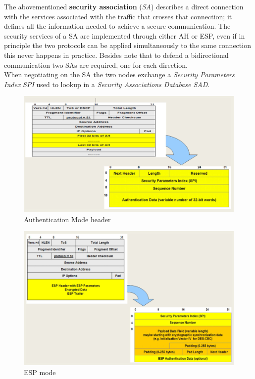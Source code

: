 The abovementioned \textbf{security association} (\textit{SA}) describes a direct connection with the
services associated with the traffic that crosses that connection;
it defines all the information needed to achieve a secure
communication.
The security services of a SA are implemented through either AH
or ESP, even if in principle the two protocols can be applied
simultaneously to the same connection this never happens in
practice.
Besides note that to defend a bidirectional communication two SAs are required,
one for each direction.\\
When negotiating on the SA the two nodes exchange a \textit{Security Parameters Index} \textit{SPI} used to lookup in a \textit{Security Associations Database SAD}.
\begin{figure}[htbp]
   \centering
   \includegraphics{images/IPSEC_ah.png}
   \caption{Authentication Mode header}
   \label{fig:IPSEC_ah}
\end{figure}
\begin{figure}[htbp]
   \centering
   \includegraphics{images/IPSEC_esp.png}
   \caption{ESP mode}
   \label{fig:IPSEC_esp}
\end{figure}
